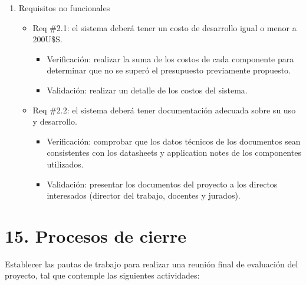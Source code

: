 \documentclass[
11pt, %
]{plan}
\begin{document}
\begin{enumerate}
\begin{itemize}
		\end{itemize}
		
	\item Requisitos no funcionales
	
		\begin{itemize}
			\item Req \#2.1: el sistema deberá tener un costo de desarrollo igual o menor a 200U\$S.

			\begin{itemize}
				\item Verificación: realizar la suma de los costos de cada componente para determinar que no se superó el presupuesto previamente propuesto.
				\item Validación: realizar un detalle de los costos del sistema.
			\end{itemize}

		\end{itemize}
		
		\begin{itemize}
			\item Req \#2.2: el sistema deberá tener documentación adecuada sobre su uso y desarrollo.

			\begin{itemize}
				\item Verificación: comprobar que los datos técnicos de los documentos sean consistentes con los datasheets y application notes de los componentes utilizados.
				\item Validación: presentar los documentos del proyecto a los directos interesados (director del trabajo, docentes y jurados).
			\end{itemize}

		\end{itemize}

\end{enumerate}

\section{15. Procesos de cierre}  
\label{sec:cierre}

Establecer las pautas de trabajo para realizar una reunión final de evaluación del proyecto, tal que contemple las siguientes actividades:
\end{document}
